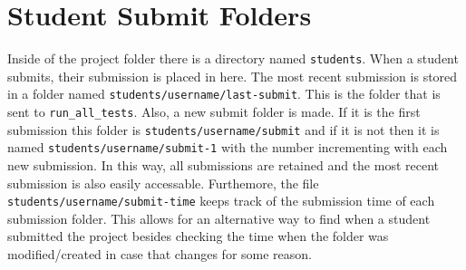 \documentclass{article}
\begin{document}
\section{Student Submit Folders}
Inside of the project folder there is a directory named \verb|students|. When a student submits, their submission is placed in here. The most recent submission is stored in a folder named \verb|students/username/last-submit|. This is the folder that is sent to \verb|run_all_tests|. Also, a new submit folder is made. If it is the first submission this folder is \verb|students/username/submit| and if it is not then it is named \verb|students/username/submit-1| with the number incrementing with each new submission. In this way, all submissions are retained and the most recent submission is also easily accessable. Furthemore, the file \verb|students/username/submit-time| keeps track of the submission time of each submission folder. This allows for an alternative way to find when a student submitted the project besides checking the time when the folder was modified/created in case that changes for some reason.
\end{document}
